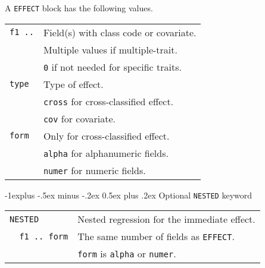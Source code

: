 \documentclass[10pt,landscape]{article}
\makeatletter
\renewcommand{\subsection}{\@startsection{subsection}{2}{0mm}%
                                {-1explus -.5ex minus -.2ex}%
                                {0.5ex plus .2ex}%
                                {\normalfont\normalsize\bfseries}}
\makeatother
\begin{document}
\begin{multicols}{3}
A \verb|EFFECT| block has the following values.
\begin{tabular}{@{}ll@{}}
  \verb|f1 ..| & Field(s) with class code or covariate.\\
              & Multiple values if multiple-trait.\\
              & \verb|0| if not needed for specific traits.\\
  \verb|type|  & Type of effect.\\
              & \verb|cross| for cross-classified effect.\\
              & \verb|cov| for covariate.\\
  \verb|form|  & Only for cross-classified effect.\\
              & \verb|alpha| for alphanumeric fields.\\
              & \verb|numer| for numeric fields.\\
\end{tabular}

\subsection{Optional \texttt{NESTED} keyword}
\begin{tabular}{@{}ll@{}}
  \verb|NESTED|  & Nested regression for the immediate effect.\\
  \verb|  f1 .. form| & The same number of fields as \verb|EFFECT|.\\
                     & \verb|form| is \verb|alpha| or \verb|numer|.\\
\end{tabular}


\end{multicols}
\end{document}
